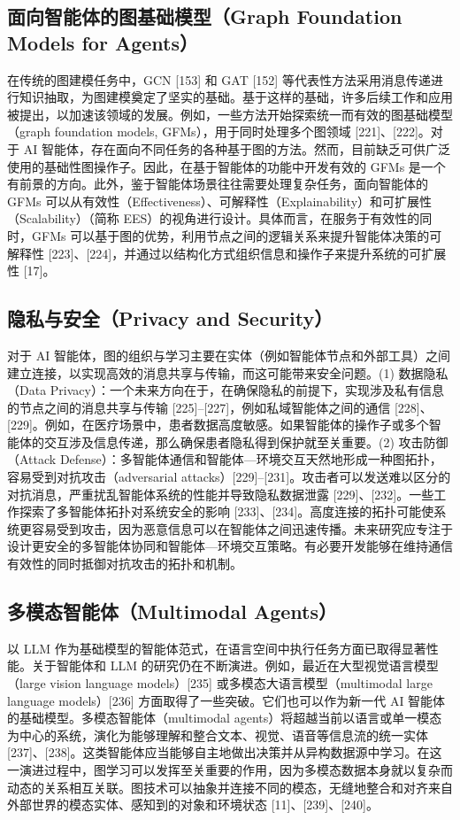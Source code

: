 \documentclass[10pt,UTF8,fontset=fandol]{ctexart}
\begin{document}
\subsection{面向智能体的图基础模型（Graph Foundation Models for Agents）}

在传统的图建模任务中，GCN [153] 和 GAT [152] 等代表性方法采用消息传递进行知识抽取，为图建模奠定了坚实的基础。基于这样的基础，许多后续工作和应用被提出，以加速该领域的发展。例如，一些方法开始探索统一而有效的图基础模型（graph foundation models, GFMs），用于同时处理多个图领域 [221]、[222]。对于 AI 智能体，存在面向不同任务的各种基于图的方法。然而，目前缺乏可供广泛使用的基础性图操作子。因此，在基于智能体的功能中开发有效的 GFMs 是一个有前景的方向。此外，鉴于智能体场景往往需要处理复杂任务，面向智能体的 GFMs 可以从有效性（Effectiveness）、可解释性（Explainability）和可扩展性（Scalability）（简称 EES）的视角进行设计。具体而言，在服务于有效性的同时，GFMs 可以基于图的优势，利用节点之间的逻辑关系来提升智能体决策的可解释性 [223]、[224]，并通过以结构化方式组织信息和操作子来提升系统的可扩展性 [17]。

\subsection{隐私与安全（Privacy and Security）}

对于 AI 智能体，图的组织与学习主要在实体（例如智能体节点和外部工具）之间建立连接，以实现高效的消息共享与传输，而这可能带来安全问题。(1) 数据隐私（Data Privacy）：一个未来方向在于，在确保隐私的前提下，实现涉及私有信息的节点之间的消息共享与传输 [225]--[227]，例如私域智能体之间的通信 [228]、[229]。例如，在医疗场景中，患者数据高度敏感。如果智能体的操作子或多个智能体的交互涉及信息传递，那么确保患者隐私得到保护就至关重要。(2) 攻击防御（Attack Defense）：多智能体通信和智能体—环境交互天然地形成一种图拓扑，容易受到对抗攻击（adversarial attacks）[229]--[231]。攻击者可以发送难以区分的对抗消息，严重扰乱智能体系统的性能并导致隐私数据泄露 [229]、[232]。一些工作探索了多智能体拓扑对系统安全的影响 [233]、[234]。高度连接的拓扑可能使系统更容易受到攻击，因为恶意信息可以在智能体之间迅速传播。未来研究应专注于设计更安全的多智能体协同和智能体—环境交互策略。有必要开发能够在维持通信有效性的同时抵御对抗攻击的拓扑和机制。

\subsection{多模态智能体（Multimodal Agents）}

以 LLM 作为基础模型的智能体范式，在语言空间中执行任务方面已取得显著性能。关于智能体和 LLM 的研究仍在不断演进。例如，最近在大型视觉语言模型（large vision language models）[235] 或多模态大语言模型（multimodal large language models）[236] 方面取得了一些突破。它们也可以作为新一代 AI 智能体的基础模型。多模态智能体（multimodal agents）将超越当前以语言或单一模态为中心的系统，演化为能够理解和整合文本、视觉、语音等信息流的统一实体 [237]、[238]。这类智能体应当能够自主地做出决策并从异构数据源中学习。在这一演进过程中，图学习可以发挥至关重要的作用，因为多模态数据本身就以复杂而动态的关系相互关联。图技术可以抽象并连接不同的模态，无缝地整合和对齐来自外部世界的模态实体、感知到的对象和环境状态 [11]、[239]、[240]。
\end{document}
